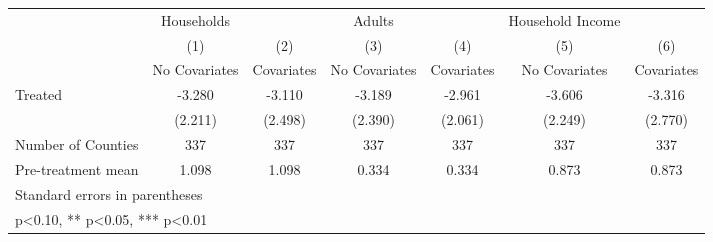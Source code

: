 {
\def\sym#1{\ifmmode^{#1}\else\(^{#1}\)\fi}
\begin{tabular}{l*{6}{c}}
\hline\hline
            &  Households   &               &      Adults   &               &Household Income   &               \\
            &\multicolumn{1}{c}{(1)}&\multicolumn{1}{c}{(2)}&\multicolumn{1}{c}{(3)}&\multicolumn{1}{c}{(4)}&\multicolumn{1}{c}{(5)}&\multicolumn{1}{c}{(6)}\\
            &\multicolumn{1}{c}{No Covariates}&\multicolumn{1}{c}{Covariates}&\multicolumn{1}{c}{No Covariates}&\multicolumn{1}{c}{Covariates}&\multicolumn{1}{c}{No Covariates}&\multicolumn{1}{c}{Covariates}\\
\hline
Treated     &      -3.280   &      -3.110   &      -3.189   &      -2.961   &      -3.606   &      -3.316   \\
            &     (2.211)   &     (2.498)   &     (2.390)   &     (2.061)   &     (2.249)   &     (2.770)   \\
\hline
Number of Counties&         337   &         337   &         337   &         337   &         337   &         337   \\
Pre-treatment mean&       1.098   &       1.098   &       0.334   &       0.334   &       0.873   &       0.873   \\
\hline\hline
\multicolumn{7}{l}{\footnotesize Standard errors in parentheses}\\
\multicolumn{7}{l}{\footnotesize * p<0.10, ** p<0.05, *** p<0.01}\\
\end{tabular}
}
